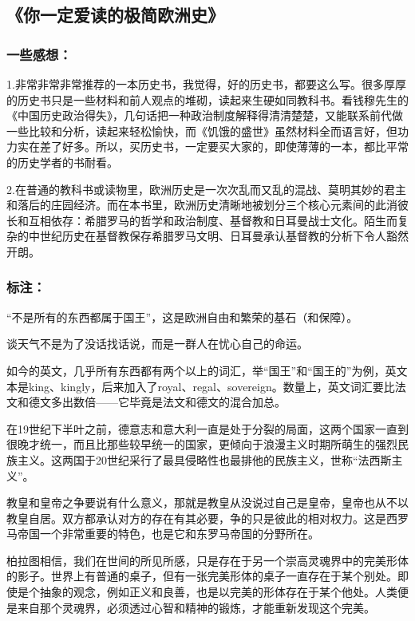 \subsection{《你一定爱读的极简欧洲史》}
\subsubsection{一些感想：}
1.非常非常非常推荐的一本历史书，我觉得，好的历史书，都要这么写。很多厚厚的历史书只是一些材料和前人观点的堆砌，读起来生硬如同教科书。看钱穆先生的《中国历史政治得失》，几句话把一种政治制度解释得清清楚楚，又能联系前代做一些比较和分析，读起来轻松愉快，而《饥饿的盛世》虽然材料全而语言好，但功力实在差了好多。所以，买历史书，一定要买大家的，即使薄薄的一本，都比平常的历史学者的书耐看。

2.在普通的教科书或读物里，欧洲历史是一次次乱而又乱的混战、莫明其妙的君主和落后的庄园经济。而在本书里，欧洲历史清晰地被划分三个核心元素间的此消彼长和互相依存：希腊罗马的哲学和政治制度、基督教和日耳曼战士文化。陌生而复杂的中世纪历史在基督教保存希腊罗马文明、日耳曼承认基督教的分析下令人豁然开朗。

\subsubsection{标注：}
“不是所有的东西都属于国王”，这是欧洲自由和繁荣的基石（和保障）。

谈天气不是为了没话找话说，而是一群人在忧心自己的命运。

如今的英文，几乎所有东西都有两个以上的词汇，举“国王”和“国王的”为例，英文本是king、kingly，后来加入了royal、regal、sovereign。数量上，英文词汇要比法文和德文多出数倍——它毕竟是法文和德文的混合加总。

在19世纪下半叶之前，德意志和意大利一直是处于分裂的局面，这两个国家一直到很晚才统一，而且比那些较早统一的国家，更倾向于浪漫主义时期所萌生的强烈民族主义。这两国于20世纪采行了最具侵略性也最排他的民族主义，世称“法西斯主义”。

教皇和皇帝之争要说有什么意义，那就是教皇从没说过自己是皇帝，皇帝也从不以教皇自居。双方都承认对方的存在有其必要，争的只是彼此的相对权力。这是西罗马帝国一个非常重要的特色，也是它和东罗马帝国的分野所在。

柏拉图相信，我们在世间的所见所感，只是存在于另一个崇高灵魂界中的完美形体的影子。世界上有普通的桌子，但有一张完美形体的桌子一直存在于某个别处。即使是个抽象的观念，例如正义和良善，也是以完美的形体存在于某个他处。人类便是来自那个灵魂界，必须透过心智和精神的锻炼，才能重新发现这个完美。